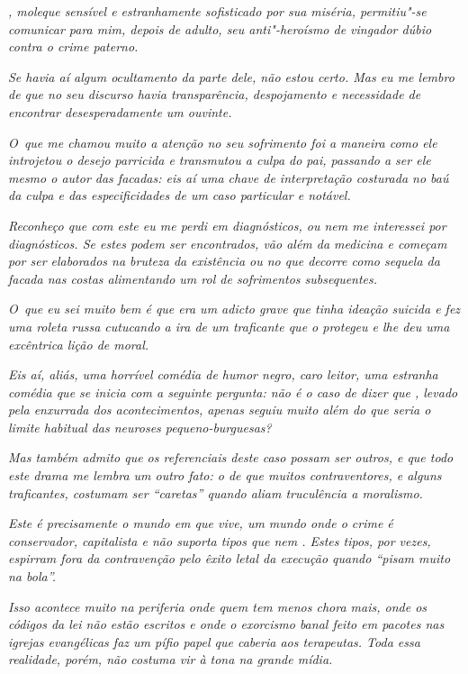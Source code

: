 \emph{, moleque sensível e estranhamente sofisticado por sua miséria,
permitiu"-se comunicar para mim, depois de adulto, seu anti"-heroísmo de
vingador dúbio contra o crime paterno.}~

\emph{Se havia aí algum ocultamento da parte dele, não estou certo. Mas
eu me lembro de que no seu discurso havia transparência, despojamento e
necessidade de encontrar desesperadamente um ouvinte.}~

\emph{O~que me chamou muito a atenção no seu sofrimento foi a maneira
como ele introjetou o desejo parricida e transmutou a culpa do pai,
passando a ser ele mesmo o autor das facadas: eis aí uma chave de
interpretação costurada no baú da culpa e das especificidades de um caso
particular e notável.}~

\emph{Reconheço que com este  eu me perdi em diagnósticos, ou nem me
interessei por diagnósticos. Se estes podem ser encontrados, vão além da
medicina e começam por ser elaborados na bruteza da existência ou no que
decorre como sequela da facada nas costas alimentando um rol de
sofrimentos subsequentes.}~

\emph{O~que eu sei muito bem é que  era um adicto grave que tinha
ideação suicida e fez uma roleta russa cutucando a ira de um traficante
que o protegeu e lhe deu uma excêntrica lição de moral.}~

\emph{Eis aí, aliás, uma horrível comédia de humor negro, caro leitor,
uma estranha comédia que se inicia com a seguinte pergunta: não é o caso
de dizer que , levado pela enxurrada dos acontecimentos, apenas seguiu
muito além do que seria o limite habitual das neuroses pequeno-burguesas?}~

\emph{Mas também admito que os referenciais deste caso possam ser
outros, e que todo este drama me lembra um outro fato: o de que muitos
contraventores, e alguns traficantes, costumam ser ``caretas'' quando
aliam truculência a moralismo.}~

\emph{Este é precisamente o mundo em que  vive, um mundo onde o crime
é conservador, capitalista e não suporta tipos que nem . Estes tipos,
por vezes, espirram fora da contravenção pelo êxito letal da execução
quando ``pisam muito na bola''.}~

\emph{Isso acontece muito na periferia onde quem tem menos chora mais,
onde os códigos da lei não estão escritos e onde o exorcismo banal feito
em pacotes nas igrejas evangélicas faz um pífio papel que caberia aos
terapeutas. Toda essa realidade, porém, não costuma vir à tona na grande
mídia.}

